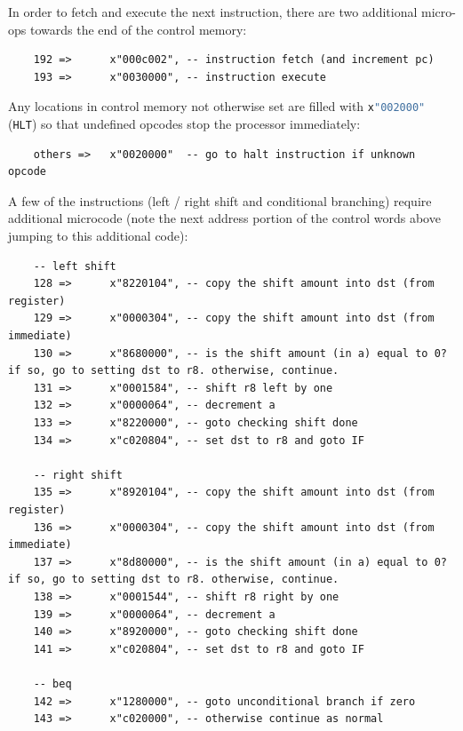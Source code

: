 \documentclass[a4paper]{article}
\numberwithin{figure}{section}
\numberwithin{table}{section}
\newcommand{\mi}{\mintinline}
\begin{document}
\smallskip
In order to fetch and execute the next instruction, there are two additional micro-ops towards the end of the 
control memory:

\begin{verbatim}
	192 =>		x"000c002", -- instruction fetch (and increment pc)
	193 =>		x"0030000", -- instruction execute
\end{verbatim}

\smallskip
Any locations in control memory not otherwise set are filled with \mi{vhdl}{x"002000"} (\mi{c}{HLT}) so that undefined opcodes stop the processor immediately:
\begin{verbatim}
	others =>	x"0020000"  -- go to halt instruction if unknown opcode
\end{verbatim}

\newpage
\smallskip
A few of the instructions (left / right shift and conditional branching) require additional microcode (note the next address portion of the control words above jumping to this additional code):
\begin{verbatim}
	-- left shift
	128 =>		x"8220104", -- copy the shift amount into dst (from register)
	129 =>		x"0000304", -- copy the shift amount into dst (from immediate)
	130 =>		x"8680000", -- is the shift amount (in a) equal to 0? if so, go to setting dst to r8. otherwise, continue.
	131 =>		x"0001584", -- shift r8 left by one
	132 =>		x"0000064", -- decrement a
	133 =>		x"8220000", -- goto checking shift done
	134 =>		x"c020804", -- set dst to r8 and goto IF

	-- right shift
	135 =>		x"8920104", -- copy the shift amount into dst (from register)
	136 =>		x"0000304", -- copy the shift amount into dst (from immediate)
	137 =>		x"8d80000", -- is the shift amount (in a) equal to 0? if so, go to setting dst to r8. otherwise, continue.
	138 =>		x"0001544", -- shift r8 right by one
	139 =>		x"0000064", -- decrement a
	140 =>		x"8920000", -- goto checking shift done
	141 =>		x"c020804", -- set dst to r8 and goto IF

	-- beq
	142 =>		x"1280000", -- goto unconditional branch if zero
	143 =>		x"c020000", -- otherwise continue as normal
\end{verbatim}


\newpage
\end{document}
